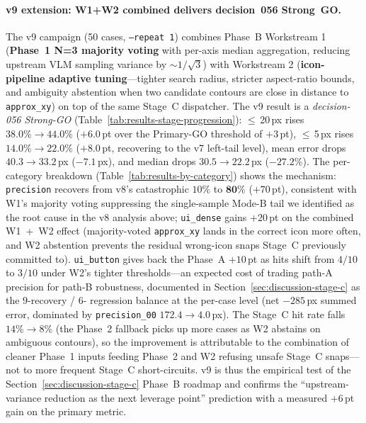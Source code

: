 \documentclass[sigconf,nonacm]{acmart}
\begin{document}
\paragraph{v9 extension: W1+W2 combined delivers decision~056
  Strong~GO.}
The v9 campaign (50 cases, \texttt{--repeat 1}) combines Phase~B
Workstream 1 (\textbf{Phase~1 N=3 majority voting} with per-axis
median aggregation, reducing upstream VLM sampling variance by
$\sim$$1/\sqrt{3}$) with Workstream 2 (\textbf{icon-pipeline adaptive
tuning}---tighter search radius, stricter aspect-ratio bounds, and
ambiguity abstention when two candidate contours are close in
distance to \texttt{approx\_xy}) on top of the same Stage~C
dispatcher.  The v9 result is a \emph{decision-056 Strong-GO}
(Table~\ref{tab:results-stage-progression}): $\leq$\,20\,px rises
$38.0\% \to \mathbf{44.0\%}$ ($+6.0$\,pt over the Primary-GO
threshold of $+3$\,pt), $\leq$\,5\,px rises $14.0\% \to
\mathbf{22.0\%}$ ($+8.0$\,pt, recovering to the v7 left-tail
level), mean error drops $40.3 \to 33.2$\,px ($-7.1$\,px), and
median drops $30.5 \to 22.2$\,px ($-27.2\%$).  The per-category
breakdown (Table~\ref{tab:results-by-category}) shows the
mechanism: \texttt{precision} recovers from v8's catastrophic
$10\%$ to $\mathbf{80\%}$ ($+70$\,pt), consistent with W1's
majority voting suppressing the single-sample Mode-B tail we
identified as the root cause in the v8 analysis above;
\texttt{ui\_dense} gains $+20$\,pt on the combined W1~+~W2 effect
(majority-voted \texttt{approx\_xy} lands in the correct icon more
often, and W2 abstention prevents the residual wrong-icon snaps
Stage~C previously committed to).  \texttt{ui\_button} gives back
the Phase~A $+10$\,pt as hits shift from $4/10$ to $3/10$ under
W2's tighter thresholds---an expected cost of trading path-A
precision for path-B robustness, documented in
Section~\ref{sec:discussion-stage-c} as the $9$-recovery / $6$-
regression balance at the per-case level (net $-285$\,px summed
error, dominated by \texttt{precision\_00} $172.4 \to 4.0$\,px).
The Stage~C hit rate falls $14\% \to 8\%$ (the Phase~2 fallback
picks up more cases as W2 abstains on ambiguous contours), so the
improvement is attributable to the combination of cleaner Phase~1
inputs feeding Phase~2 and W2 refusing unsafe Stage~C snaps---not
to more frequent Stage~C short-circuits.  v9 is thus the empirical
test of the Section~\ref{sec:discussion-stage-c} Phase~B roadmap
and confirms the ``upstream-variance reduction as the next leverage
point'' prediction with a measured $+6$\,pt gain on the primary
metric.
\end{document}
